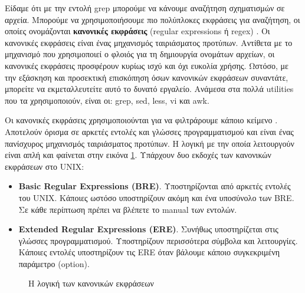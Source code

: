 Είδαμε ότι με την εντολή grep μπορούμε να  κάνουμε αναζήτηση σχηματισμών σε αρχεία. Μπορούμε να χρησιμοποιήσουμε πιο πολύπλοκες εκφράσεις
για αναζήτηση, οι οποίες ονομάζονται \textbf{κανονικές εκφράσεις} (regular expressions ή regex) \cite{nemeth2011unix}\cite{kochan2016shell}. Οι κανονικές εκφράσεις είναι ένας
μηχανισμός ταιριάσματος προτύπων. Αντίθετα με το μηχανισμό που χρησιμοποιεί ο φλοιός για τη δημιουργία ονομάτων αρχείων, οι κανονικές
εκφράσεις προσφέρουν κυρίως ισχύ και όχι ευκολία χρήσης. Ωστόσο, με την εξάσκηση και προσεκτική επισκόπηση όσων κανονικών εκφράσεων
συναντάτε, μπορείτε να εκμεταλλευτείτε αυτό το δυνατό εργαλείο. Ανάμεσα στα πολλά utilities που τα χρησιμοποιούν, είναι οι: grep, sed, less, vi και awk.

Οι κανονικές εκφράσεις χρησιμοποιούνται για να φιλτράρουμε κάποιο κείμενο \cite{blum2008linux}. Αποτελούν όρισμα σε αρκετές εντολές και γλώσσες προγραμματισμού και είναι ένας πανίσχυρος μηχανισμός ταιριάσματος προτύπων. Η λογική με την οποία λειτουργούν είναι απλή και φαίνεται στην εικόνα \ref{fig:reg-ex}.
Υπάρχουν δυο εκδοχές των κανονικών εκφράσεων στο UNIX:
\begin{itemize}
	\item \textbf{Basic Regular Expressions (BRE)}. Υποστηρίζονται από αρκετές εντολές του UNIX. Κάποιες ωστόσο υποστηρίζουν ακόμη και ένα υποσύνολο των BRE. Σε κάθε περίπτωση πρέπει να βλέπετε το manual των εντολών.
	\item \textbf{Extended Regular Expressions (ERE)}. Συνήθως υποστηρίζεται στις γλώσσες προγραμματισμού. Υποστηρίζουν περισσότερα σύμβολα και λειτουργίες. Κάποιες εντολές υποστηρίζουν τις ERE όταν βάλουμε κάποιο συγκεκριμένη παράμετρο (option).
\end{itemize}

\begin{figure}
	\centering
	\caption{Η λογική των κανονικών εκφράσεων}
	\label{fig:reg-ex}
\end{figure} 

